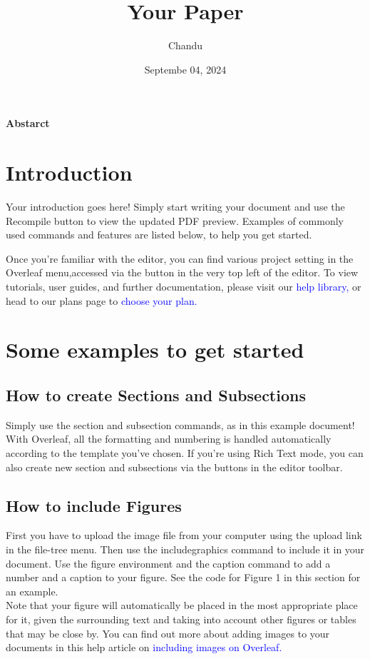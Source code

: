 \documentclass{article}
\title{Your Paper}
\author{Chandu}
\date{Septembe 04, 2024}
\begin{document}
	\maketitle
	\center\textbf{Abstarct}\\
	
	\section{Introduction}
	Your introduction goes here! Simply start writing your document and use the Recompile button to
	view the updated PDF preview. Examples of commonly used commands and features are listed below,
	to help you get started.	

  \hspace{1cm}	Once you’re familiar with the editor, you can find various project setting in the Overleaf menu,accessed via the button in the very top left of the editor. To view tutorials, user guides, and further
	documentation, please visit our 
	\textcolor{blue} {help library,} or head to our plans page to \textcolor{blue} {choose your plan.}\\
	\section{Some examples to get started}
	\subsection{How to create Sections and Subsections}
	Simply use the section and subsection commands, as in this example document! With Overleaf, all
	the formatting and numbering is handled automatically according to the template you’ve chosen. If
	you’re using Rich Text mode, you can also create new section and subsections via the buttons in the
	editor toolbar.
	\subsection{How to include Figures}
	First you have to upload the image file from your computer using the upload link in the file-tree menu.
	Then use the includegraphics command to include it in your document. Use the figure environment
	and the caption command to add a number and a caption to your figure. See the code for Figure 1 in this section for an example.\\
	\hspace{1cm}Note that your figure will automatically be placed in the most appropriate place for it, given the
	surrounding text and taking into account other figures or tables that may be close by. You can find
	out more about adding images to your documents in this help article on
	\textcolor{blue}{ including images on Overleaf.
	}
\end{document}
